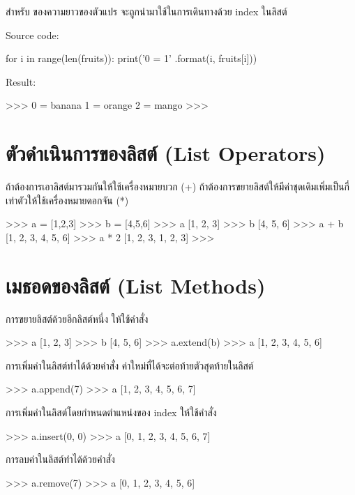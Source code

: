 สำหรับ   ของความยาวของตัวแปร จะถูกนำมาใช้ในการเดินทางด้วย index ในลิสต์

Source code:
\begin{pycode}
for i in range(len(fruits)):
    print('{0} = {1}' .format(i, fruits[i]))
\end{pycode}

Result:
\begin{pycode}
>>>
0 = banana
1 = orange
2 = mango
>>>
\end{pycode}

\section{ตัวดำเนินการของลิสต์ (List Operators)}

ถ้าต้องการเอาลิสต์มารวมกันให้ใช้เครื่องหมายบวก (+) ถ้าต้องการขยายลิสต์ให้มีค่าชุดเดิมเพิ่มเป็นกี่เท่าตัวให้ใช้เครื่องหมายดอกจัน (*)

\begin{pycode}
>>> a = [1,2,3]
>>> b = [4,5,6]
>>> a
[1, 2, 3]
>>> b
[4, 5, 6]
>>> a + b
[1, 2, 3, 4, 5, 6]
>>> a * 2
[1, 2, 3, 1, 2, 3]
>>>
\end{pycode}


\section{เมธอดของลิสต์ (List Methods)}

การขยายลิสต์ด้วยอีกลิสต์หนึ่ง ให้ใช้คำสั่ง  
\begin{pycode}
>>> a
[1, 2, 3]
>>> b
[4, 5, 6]
>>> a.extend(b)
>>> a
[1, 2, 3, 4, 5, 6]
\end{pycode}

การเพิ่มค่าในลิสต์ทำได้ด้วยคำสั่ง   ค่าใหม่ที่ได้จะต่อท้ายตัวสุดท้ายในลิสต์
\begin{pycode}
>>> a.append(7)
>>> a
[1, 2, 3, 4, 5, 6, 7]
\end{pycode}


การเพิ่มค่าในลิสต์โดยกำหนดตำแหน่งของ  index ให้ใช้คำสั่ง  
\begin{pycode}
>>> a.insert(0, 0)
>>> a
[0, 1, 2, 3, 4, 5, 6, 7]
\end{pycode}


การลบค่าในลิสต์ทำได้ด้วยคำสั่ง  
\begin{pycode}
>>> a.remove(7)
>>> a
[0, 1, 2, 3, 4, 5, 6]
\end{pycode}


